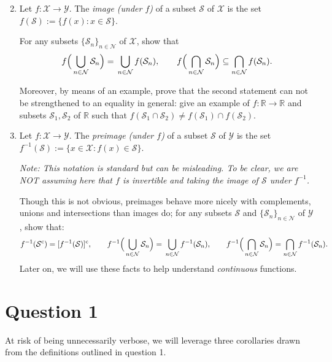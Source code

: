 \documentclass[12 pt,letterpaper]{article}
\newcommand{\bbR}{\mathbb{R}}
\newcommand{\calN}{\mathcal{N}}
\newcommand{\calS}{\mathcal{S}}
\newcommand{\calX}{\mathcal{X}}
\newcommand{\calY}{\mathcal{Y}}
\newcommand{\rmc}{\mathrm{c}}
\newcommand{\Bigparen}[1]{\Bigl({#1}\Bigr)}
\newcommand{\set}[1]{\{{#1}\}}
\begin{document}
\begin{enumerate}
\setcounter{enumi}{1}
\item
Let $f:\calX\rightarrow\calY$.
The \textit{image (under $f$)} of a subset $\calS$ of $\calX$ is the set
$f(\calS):=\set{f(x): x\in\calS}$.

For any subsets $\set{\calS_n}_{n\in\calN}$ of $\calX$, show that
\begin{equation*}
f\Bigparen{\,\bigcup_{n\in\calN}\calS_n}
=\,\bigcup_{n\in\calN}f(\calS_n),
\qquad
f\Bigparen{\,\bigcap_{n\in\calN}\calS_n}
\subseteq\bigcap_{n\in\calN}f(\calS_n).
\end{equation*}

Moreover, by means of an example, prove that the second statement can not be strengthened to an equality in general:
give an example of $f:\bbR\rightarrow\bbR$ and subsets $\calS_1,\calS_2$ of $\bbR$ such that $f(\calS_1\cap\calS_2)\neq f(\calS_1)\cap f(\calS_2)$.

\item
Let $f:\calX\rightarrow\calY$.
The \textit{preimage (under $f$)} of a subset $\calS$ of $\calY$ is the set
$f^{-1}(\calS):=\set{x\in\calX: f(x)\in\calS}$.

\textit{Note: This notation is standard but can be misleading.
To be clear, we are NOT assuming here that $f$ is invertible and taking the image of $\calS$ under $f^{-1}$.}

Though this is not obvious, preimages behave more nicely with complements, unions and intersections than images do;
for any subsets $\calS$ and $\set{\calS_n}_{n\in\calN}$ of $\calY$, show that:
\begin{equation*}
f^{-1}(\calS^\rmc)
=[f^{-1}(\calS)]^\rmc,
\qquad
f^{-1}\Bigparen{\,\bigcup_{n\in\calN}\calS_n}
=\,\bigcup_{n\in\calN}f^{-1}(\calS_n),
\qquad
f^{-1}\Bigparen{\,\bigcap_{n\in\calN}\calS_n}
=\bigcap_{n\in\calN}f^{-1}(\calS_n).
\end{equation*}
Later on, we will use these facts to help understand \textit{continuous} functions.

\end{enumerate}

\clearpage
\section*{Question 1}

At risk of being unnecessarily verbose,
we will leverage three corollaries drawn from the definitions outlined in question 1.
\end{document}
